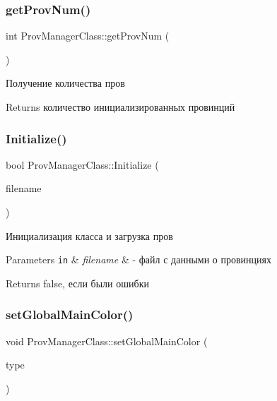 \subsubsection{\texorpdfstring{get\+Prov\+Num()}{getProvNum()}}
{\footnotesize\ttfamily int Prov\+Manager\+Class\+::get\+Prov\+Num (\begin{DoxyParamCaption}{ }\end{DoxyParamCaption})}



Получение количества пров 

\begin{DoxyReturn}{Returns}
количество инициализированных провинций 
\end{DoxyReturn}
\mbox{\label{class_prov_manager_class_a261874a451d1fa7b358d45f8c3a9dde1}} 
\subsubsection{\texorpdfstring{Initialize()}{Initialize()}}
{\footnotesize\ttfamily bool Prov\+Manager\+Class\+::\+Initialize (\begin{DoxyParamCaption}\item[{\hyperlink{class_path_class}{Path\+Class} $\ast$}]{filename }\end{DoxyParamCaption})}



Инициализация класса и загрузка пров 


\begin{DoxyParams}[1]{Parameters}
\mbox{\tt in}  & {\em filename} & -\/ файл с данными о провинциях \\
\hline
\end{DoxyParams}
\begin{DoxyReturn}{Returns}
false, если были ошибки 
\end{DoxyReturn}
\mbox{\label{class_prov_manager_class_ade2e5dfca7ae27617b8538876fce23f4}} 
\subsubsection{\texorpdfstring{set\+Global\+Main\+Color()}{setGlobalMainColor()}}
{\footnotesize\ttfamily void Prov\+Manager\+Class\+::set\+Global\+Main\+Color (\begin{DoxyParamCaption}\item[{\hyperlink{class_global_manager_class_a794b4a5298c61f8d25d9da44b7826857}{Global\+Manager\+Class\+::region\+Type}}]{type }\end{DoxyParamCaption})}




